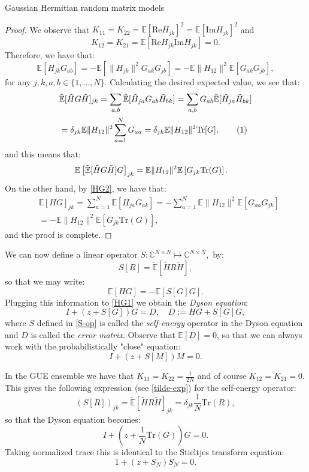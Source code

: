 \documentclass[11pt, a4paper, oneside]{book}
\numberwithin{equation}{chapter}
\newcommand{\E}{\mathbb E}
\newcommand{\beq}{\begin{equation}}
\newcommand{\eeq}{\end{equation}}
\newcommand\numberthis{\addtocounter{equation}{1}\tag{\theequation}}
\begin{document}
\begin{section}{Gaussian Hermitian random matrix models}
\begin{proof}
    We observe that $K_{11} = K_{22} = \E [\mathrm{Re}H_{jk} ]^2 = \E [\mathrm{Im}H_{jk} ]^2$ and $$ K_{12}=K_{21} = \E [\mathrm{Re}H_{jk} \mathrm{Im}H_{jk} ] = 0.$$
    Therefore, we have that:
    \begin{equation} \label{HG2}
        \E[H_{jk}G_{ab}] = - \E \left [ \| H_{jk}\|^2 G_{ak}G_{jb} \right ] = - \E \| H_{12}\|^2 \E \left [ G_{ak}G_{jb} \right ] ,
    \end{equation}
    for any $j,k,a,b \in \{1,...,N\}.$ Calculating the desired expected value, we see that:
    \begin{align*} \label{tilde-exp}
    &\Tilde{\E}[\Tilde{H}G\Tilde{H}]_{jk} = \sum \limits_{a,b} \tilde{\E} [ \tilde{H}_{ja} G_{ab} \tilde{H}_{bk} ] = \sum \limits_{a,b} G_{ab} \tilde{\E} [ \tilde{H}_{ja} \tilde{H}_{bk}] \\
    &= \delta_{jk} \E\| H_{12} \|^2 \sum \limits_{a=1}^N G_{aa} = 
    \delta_{jk} \E\| H_{12} \|^2 \mathrm{Tr}[G], \numberthis
    \end{align*}
    and this means that:
    \begin{align*}
    &\E \left [ \Tilde{\E}[\Tilde{H}G\Tilde{H}] G \right]_{jk} =  \E\| H_{12} \|^2 \E \left [ G_{jk} \mathrm{Tr}(G) \right ] .
    \end{align*}
    On the other hand, by \eqref{HG2}, we have that:
    \begin{align*}
    &\E [ HG]_{jk} = \sum \limits_{a=1}^N \E \left [ H_{ja} G_{ak} \right ] = - \sum \limits_{a=1}^N \E \| H_{12} \|^2 \E \left [ G_{aa} G_{jk} \right ] \\
    &= - \E\| H_{12} \|^2 \E \left [ G_{jk} \mathrm{Tr}(G) \right ] ,
    \end{align*}
    and the proof is complete.
\end{proof}
%
We can now define a linear operator $S: \mathbb{C}^{N \times N} \mapsto \mathbb{C}^{N \times N},$ by:
%
\beq \label{S-op}
S[R] = \tilde{\E} [\tilde{H} R \tilde{H} ] ,
\eeq
so that we may write:
\beq
\E [HG] = - \E [S[G]G].
\eeq
%
Plugging this information to \eqref{HG1} we obtain the \textit{Dyson equation}:
%
\beq \label{DysonE1}
I + (z+S[G])G = D , \quad D := HG + S[G]G,
\eeq
%
where $S$ defined in \eqref{S-op} is called the \textit{self-energy} operator in the Dyson equation and $D$ is called the \textit{error matrix}. Observe that $\E[D]=0$, so that we can always work with the probabilistically "close" equation:
%
\beq \label{DysonE2}
I + (z+S[M])M = 0 .
\eeq

In the GUE ensemble we have that $K_{11} = K_{22} = \frac{1}{2N}$ and of course $K_{12}=K_{21}=0.$ This gives the following expression (see \eqref{tilde-exp}) for the self-energy operator:
%
\beq
(S[R])_{jk} = \tilde{\E} [\tilde{H} R \tilde{H} ]_{jk} = \delta_{jk} \frac{1}{N} \mathrm{Tr}(R),
\eeq
%
so that the Dyson equation becomes:
\beq
I + \left (z + \frac{1}{N} \mathrm{Tr}(G) \right )G = 0.
\eeq
%
Taking normalized trace this is identical to the Stieltjes transform equation:
%
\beq
1 + (z + S_N)S_N = 0 .
\eeq
\end{section}
\end{document}
